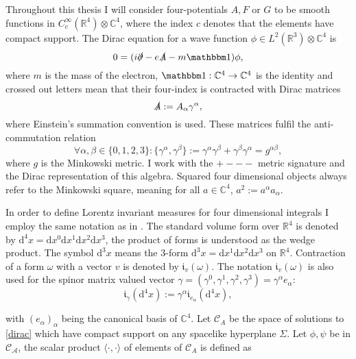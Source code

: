 \documentclass[b5paper,draft,openbib,12pt]{memoir}
\newcommand{\id}{{\mathbbm 1}}
\begin{document}
Throughout this thesis I will consider four-potentials $A, F$ or \(G\) to be smooth functions
in \(C_{c}^\infty(\mathbb{R}^4)\otimes \mathbb{C}^4\), where the index \(c\)
denotes that the elements have compact support. The Dirac
equation for a wave function \(\phi \in L^2(\mathbb{R}^3)\otimes \mathbb{C}^4\)
is
\begin{equation}\label{dirac}
0= (i\slashed{\partial}-e\slashed{A}-m \id) \phi,
\end{equation}
where \(m\) is the mass of the electron, \(\id: \mathbb{C}^4\rightarrow \mathbb{C}^4\) is the identity  and crossed out letters mean that their four-index is contracted with Dirac matrices
\begin{equation}
\slashed{A}:= A_\alpha \gamma^\alpha,
\end{equation}
where Einstein's summation convention is used. These matrices fulfil the anti-commutation relation
\begin{equation}
\forall \alpha, \beta \in \{0,1,2,3\}:\{\gamma^\alpha, \gamma^\beta\}:= \gamma^\alpha \gamma^\beta+ \gamma^\beta \gamma^\alpha= g^{\alpha \beta},
\end{equation}
where \(g\) is the Minkowski metric. I work with the \(+---\) metric signature and the Dirac representation of this algebra. Squared four dimensional objects always refer to the Minkowski square, meaning for all \(a\in \mathbb{C}^4\), \(a^2:= a^{\alpha} a_{\alpha}\). 

In order to define Lorentz invariant measures for four dimensional integrals I employ the same notation as in \cite{ivp1}. The standard volume form over \(\mathbb{R}^4\) is denoted by \(\mathrm{d}^4 x= \mathrm{d}x^0 \mathrm{d}x^1\mathrm{d}x^2 \mathrm{d}x^3\), the product of forms is understood as the wedge product. The symbol \(\mathrm{d}^3x\)  means the 3-form \(\mathrm{d}^3x= \mathrm{d}x^1\mathrm{d}x^2\mathrm{d}x^3\) on \(\mathbb{R}^4\). Contraction of a form \(\omega\) with a vector \(v\) is denoted by \(\mathfrak{i}_v(\omega)\). The notation \(\mathfrak{i}_v (\omega)\) is also used for the spinor matrix valued vector \(\gamma=(\gamma^0,\gamma^1,\gamma^2,\gamma^3)=\gamma^\alpha e_\alpha\):
\begin{equation}
\mathfrak{i}_\gamma (\mathrm{d}^4x) := \gamma^\alpha \mathfrak{i}_{e_\alpha}(\mathrm{d}^4 x),
\end{equation} 

with \((e_\alpha)_{\alpha}\) being the canonical basis of \(\mathbb{C}^4\). Let \(\mathcal{C}_A\) be the space of solutions to \eqref{dirac} which have compact support on any spacelike hyperplane \(\Sigma\). Let \(\phi, \psi\) be in \(\mathcal{C_A}\), the scalar product \(\langle \cdot, \cdot\rangle\) of elements of \(\mathcal{C}_A\) is defined as
\end{document}

